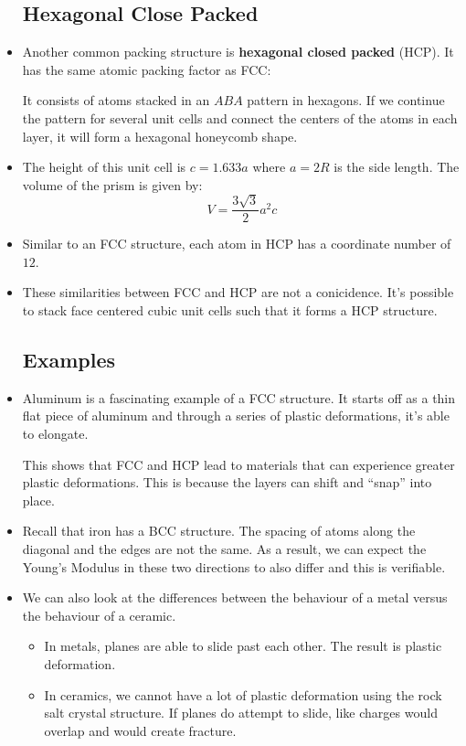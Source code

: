\begin{itemize}
    \subsection{Hexagonal Close Packed}
    \item Another common packing structure is \textbf{hexagonal closed packed} (HCP). It has the same atomic packing factor as FCC:
    \begin{center}
    \end{center}
    It consists of atoms stacked in an $ABA$ pattern in hexagons. If we continue the pattern for several unit cells and connect the centers of the atoms in each layer, it will form a hexagonal honeycomb shape.
    \item The height of this unit cell is $c=1.633a$ where $a=2R$ is the side length. The volume of the prism is given by:
    \begin{equation}
        V = \frac{3\sqrt{3}}{2}a^2c
    \end{equation}
    \item Similar to an FCC structure, each atom in HCP has a coordinate number of $12$.
    \item These similarities between FCC and HCP are not a conicidence. It's possible to stack face centered cubic unit cells such that it forms a HCP structure.
    \subsection{Examples}
    \item Aluminum is a fascinating example of a FCC structure. It starts off as a thin flat piece of aluminum and through a series of plastic deformations, it's able to elongate.

    This shows that FCC and HCP lead to materials that can experience greater plastic deformations. This is because the layers can shift and ``snap'' into place.
    \item Recall that iron has a BCC structure. The spacing of atoms along the diagonal and the edges are not the same. As a result, we can expect the Young's Modulus in these two directions to also differ and this is verifiable.
    \item We can also look at the differences between the behaviour of a metal versus the behaviour of a ceramic.
    \begin{itemize}
        \item In metals, planes are able to slide past each other. The result is plastic deformation.
        \item In ceramics, we cannot have a lot of plastic deformation using the rock salt crystal structure. If planes do attempt to slide, like charges would overlap and would create fracture.
    \end{itemize}
\end{itemize}